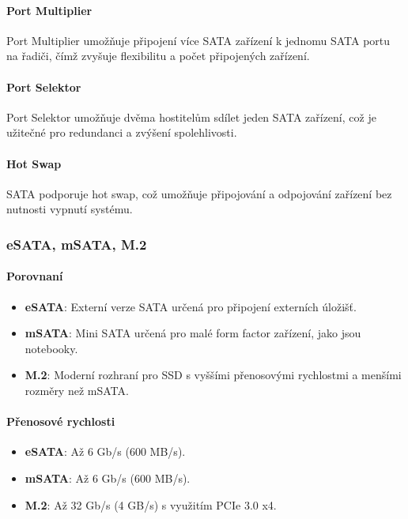 \paragraph{Port Multiplier}
Port Multiplier umožňuje připojení více SATA zařízení k jednomu SATA portu na řadiči, čímž zvyšuje flexibilitu a počet připojených zařízení.

\paragraph{Port Selektor}
Port Selektor umožňuje dvěma hostitelům sdílet jeden SATA zařízení, což je užitečné pro redundanci a zvýšení spolehlivosti.

\paragraph{Hot Swap}
SATA podporuje hot swap, což umožňuje připojování a odpojování zařízení bez nutnosti vypnutí systému.

\subsubsection{eSATA, mSATA, M.2}

\paragraph{Porovnaní}
\begin{itemize}
\item \textbf{eSATA}: Externí verze SATA určená pro připojení externích úložišť.
\item \textbf{mSATA}: Mini SATA určená pro malé form factor zařízení, jako jsou notebooky.
\item \textbf{M.2}: Moderní rozhraní pro SSD s vyššími přenosovými rychlostmi a menšími rozměry než mSATA.
\end{itemize}

\paragraph{Přenosové rychlosti}
\begin{itemize}
\item \textbf{eSATA}: Až 6 Gb/s (600 MB/s).
\item \textbf{mSATA}: Až 6 Gb/s (600 MB/s).
\item \textbf{M.2}: Až 32 Gb/s (4 GB/s) s využitím PCIe 3.0 x4.
\end{itemize}

